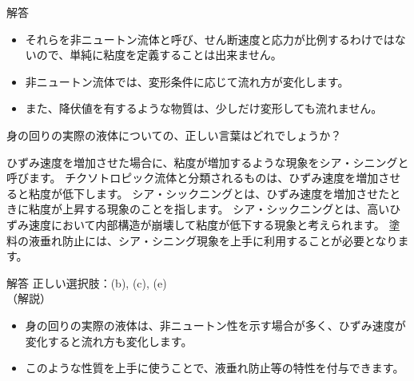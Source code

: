 \documentclass[uplatex,dvipdfmx,a4paper,11pt]{jsarticle}
\begin{document}
\begin{qlist}
\begin{itembox}[l]{解答}
\begin{itemize}
				\item それらを非ニュートン流体と呼び、せん断速度と応力が比例するわけではないので、単純に粘度を定義することは出来ません。
				\item 非ニュートン流体では、変形条件に応じて流れ方が変化します。
				\item また、降伏値を有するような物質は、少しだけ変形しても流れません。
			\end{itemize}
        \end{itembox}
	\qitem 身の回りの実際の液体についての、正しい言葉はどれでしょうか？
		\begin{qlist2}
			\qitem ひずみ速度を増加させた場合に、粘度が増加するような現象をシア・シニングと呼びます。
			\qitem チクソトロピック流体と分類されるものは、ひずみ速度を増加させると粘度が低下します。
			\qitem シア・シックニングとは、ひずみ速度を増加させたときに粘度が上昇する現象のことを指します。
			\qitem シア・シックニングとは、高いひずみ速度において内部構造が崩壊して粘度が低下する現象と考えられます。
			\qitem 塗料の液垂れ防止には、シア・シニング現象を上手に利用することが必要となります。
		\end{qlist2}
		\vspace{3mm}
        \begin{itembox}[l]{解答}
            正しい選択肢：(b), (c), (e)\\
            （解説）
			\begin{itemize}
				\item 身の回りの実際の液体は、非ニュートン性を示す場合が多く、ひずみ速度が変化すると流れ方も変化します。
				\item このような性質を上手に使うことで、液垂れ防止等の特性を付与できます。 
			\end{itemize}
        \end{itembox}
\end{qlist}
\end{document}
